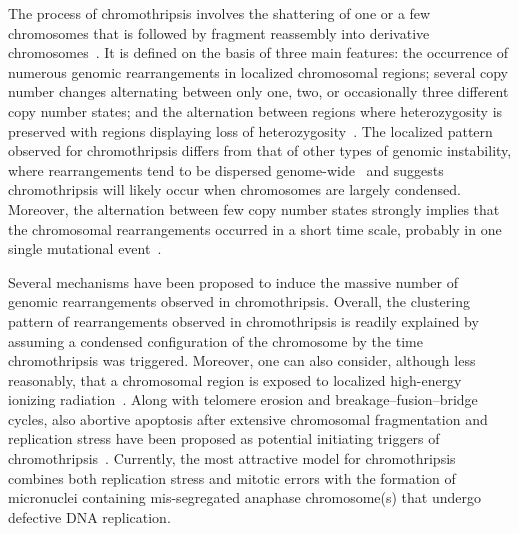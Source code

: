 The process of chromothripsis involves the shattering of one or a few chromosomes that is followed by fragment reassembly into derivative chromosomes~\cite{maher2012chromothripsis}. It is defined on the basis of three main features: the occurrence of numerous genomic rearrangements in localized chromosomal
regions; several copy number changes alternating between only one, two, or occasionally three different copy number states; and the alternation between
regions where heterozygosity is preserved with regions displaying loss of heterozygosity~\cite{maher2012chromothripsis}. The localized pattern observed for
chromothripsis differs from that of other types of genomic instability, where rearrangements tend to be dispersed genome-wide~\cite{campbell2008identification,stephens2009complex} and suggests chromothripsis will likely occur when chromosomes are largely condensed. Moreover, the alternation between few copy
number states strongly implies that the chromosomal rearrangements occurred in a short time scale, probably in one single mutational event~\cite{stephens2011massive, righolt2012shattered}.

Several mechanisms have been proposed to induce the massive number of genomic rearrangements observed in chromothripsis. Overall, the clustering
pattern of rearrangements observed in chromothripsis is readily explained by assuming a condensed configuration of the chromosome by the time
chromothripsis was triggered. Moreover, one can also consider, although less reasonably, that a chromosomal region is exposed to localized high-energy
ionizing radiation~\cite{misteli2007beyond}. Along with telomere erosion and breakage–fusion–bridge cycles, also abortive apoptosis after extensive chromosomal
fragmentation and replication stress have been proposed as potential initiating triggers of chromothripsis~\cite{jones2012chromothripsis}.
Currently, the most attractive model for chromothripsis combines both replication stress and mitotic errors with the formation of micronuclei containing
mis-segregated anaphase chromosome(s) that undergo defective DNA replication.

